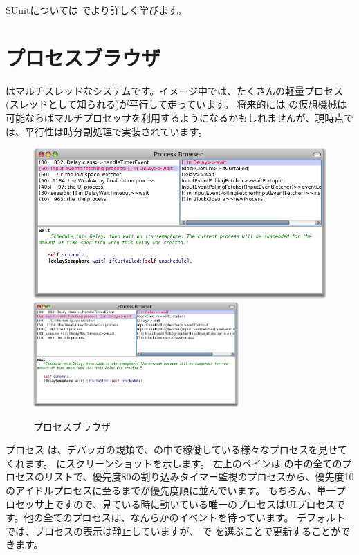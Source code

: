 \documentclass[a4paper,10pt,twoside]{book}
\begin{document}
SUnitについては  でより詳しく学びます。


\section{プロセスブラウザ}

\st はマルチスレッドなシステムです。イメージ中では、たくさんの軽量プロセス(スレッドとして知られる)が平行して走っています。
将来的には \pharo の仮想機械は可能ならばマルチプロセッサを利用するようになるかもしれませんが、現時点では、平行性は時分割処理で実装されています。

\begin{figure}[btp]
\begin{center}
\ifluluelse
{\includegraphics[width=\textwidth]{processBrowser}}
{\includegraphics[width=0.7\textwidth]{processBrowser}}
\end{center}
\caption{プロセスブラウザ}
\end{figure}

プロセス  は、デバッガの親類で、\pharo の中で稼働している様々なプロセスを見せてくれます。
 にスクリーンショットを示します。
左上のペインは \pharo の中の全てのプロセスのリストで、優先度80の割り込みタイマー監視のプロセスから、優先度10のアイドルプロセスに至るまでが優先度順に並んでいます。
もちろん、単一プロセッサ上ですので、見ている時に動いている唯一のプロセスはUIプロセスです。他の全てのプロセスは、なんらかのイベントを待っています。
デフォルトでは、プロセスの表示は静止していますが、 で  を選ぶことで更新することができます。
\end{document}
